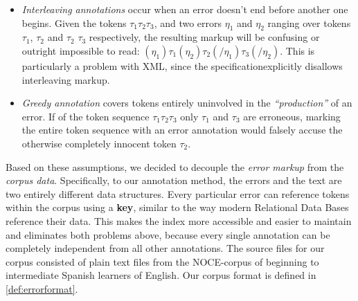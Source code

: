 \documentclass[12pt]{article}
\begin{document}
\begin{itemize}
\item \textit{Interleaving annotations} occur when an error doesn't end before
another one begins. Given the tokens $\tau_1 \tau_2 \tau_3$, and two errors
$\eta_1$ and
$\eta_2$ ranging over tokens $\tau_1$, $\tau_2$ and $\tau_2$ $\tau_3$ respectively, the
resulting markup will be confusing or outright impossible to read: $(\eta_1)\tau_1
(\eta_2)\tau_2(/\eta_1)\tau_3(/\eta_2)$. This is particularly a problem with XML,
since the specification\footnotemark explicitly disallows interleaving
markup.
\item \textit{Greedy annotation} covers tokens entirely uninvolved in the
\textit{``production''} of an error. If of the token sequence $\tau_1 \tau_2
\tau_3$ only $\tau_1$
and $\tau_3$ are erroneous,
marking the entire token sequence with an error annotation would falsely accuse
the
otherwise completely innocent token $\tau_2$.
\end{itemize}

Based on these assumptions, we decided to decouple the \textit{error markup}
from the \textit{corpus data}. Specifically, to our annotation method, the
errors and the text are two entirely different data structures. Every particular
error can reference tokens within the corpus using a \textbf{key}, similar to
the way modern Relational Data Bases reference their data. This makes the index
more accessible and easier to maintain and eliminates both problems above,
because every single annotation can be completely independent from all other
annotations.  The source files for our corpus consisted of plain text files from
the NOCE-corpus of beginning to intermediate Spanish learners of English. Our
corpus format is defined in \ref{def:errorformat}.
\end{document}
